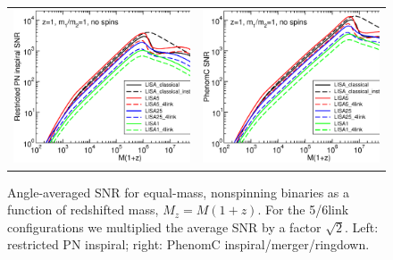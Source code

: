 \documentclass{iopart}
\begin{document}
%
\begin{figure}[H]
\begin{center}
\begin{tabular}{cc}
\includegraphics[scale=0.33,clip=true]{FigEmanuele/SNRinsp.eps}
&\includegraphics[scale=0.33,clip=true]{FigEmanuele/SNRIMR.eps}\\
\end{tabular}
\caption{\label{fig:SNR} Angle-averaged SNR for equal-mass, nonspinning
  binaries as a function of redshifted mass, $M_z=M(1+z)$. For the 5/6link
  configurations we multiplied the average SNR by a factor $\sqrt{2}$. Left:
  restricted PN inspiral; right: {\sc PhenomC} inspiral/merger/ringdown.}
\end{center}
\end{figure}
%
\end{document}
